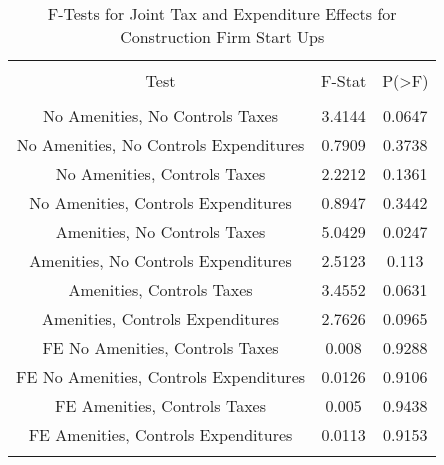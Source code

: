 
\begin{table}[!htbp] \centering 
  \caption{F-Tests for Joint Tax and Expenditure Effects for Construction Firm Start Ups} 
  \label{23Ftests} 
\begin{tabular}{@{\extracolsep{5pt}} ccc} 
\\[-1.8ex]\hline 
\hline \\[-1.8ex] 
Test & F-Stat & P(\textgreater F) \\ 
\hline \\[-1.8ex] 
No Amenities, No Controls Taxes & 3.4144 & 0.0647 \\ 
No Amenities, No Controls Expenditures & 0.7909 & 0.3738 \\ 
No Amenities, Controls Taxes & 2.2212 & 0.1361 \\ 
No Amenities, Controls Expenditures & 0.8947 & 0.3442 \\ 
Amenities, No Controls Taxes & 5.0429 & 0.0247 \\ 
Amenities, No Controls Expenditures & 2.5123 & 0.113 \\ 
Amenities, Controls Taxes & 3.4552 & 0.0631 \\ 
Amenities, Controls Expenditures & 2.7626 & 0.0965 \\ 
FE No Amenities, Controls Taxes & 0.008 & 0.9288 \\ 
FE No Amenities, Controls Expenditures & 0.0126 & 0.9106 \\ 
FE Amenities, Controls Taxes & 0.005 & 0.9438 \\ 
FE Amenities, Controls Expenditures & 0.0113 & 0.9153 \\ 
\hline \\[-1.8ex] 
\end{tabular} 
\end{table} 
